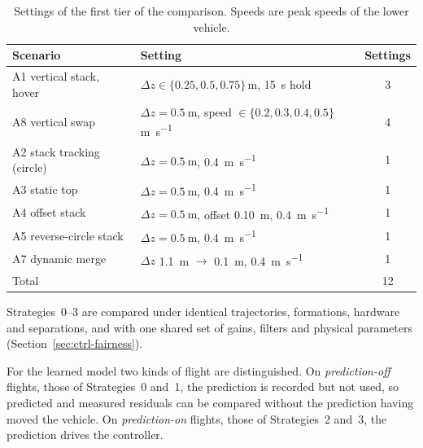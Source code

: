 \begin{table}[t]
  \centering
  \caption{Settings of the first tier of the comparison. Speeds are peak speeds of the lower vehicle.}
  \label{tab:setup-tier1}
  \small
  \begin{tabular}{@{}llc@{}}
    \toprule
    Scenario & Setting & Settings \\
    \midrule
    A1 vertical stack, hover & $\Delta z \in \{0.25, 0.5, 0.75\}$\,\si{\metre}, \SI{15}{\second} hold & 3 \\
    A8 vertical swap & $\Delta z = \SI{0.5}{\metre}$, speed $\in \{0.2, 0.3, 0.4, 0.5\}$\,\si{\metre\per\second} & 4 \\
    A2 stack tracking (circle) & $\Delta z = \SI{0.5}{\metre}$, \SI{0.4}{\metre\per\second} & 1 \\
    A3 static top & $\Delta z = \SI{0.5}{\metre}$, \SI{0.4}{\metre\per\second} & 1 \\
    A4 offset stack & $\Delta z = \SI{0.5}{\metre}$, offset \SI{0.10}{\metre}, \SI{0.4}{\metre\per\second} & 1 \\
    A5 reverse-circle stack & $\Delta z = \SI{0.5}{\metre}$, \SI{0.4}{\metre\per\second} & 1 \\
    A7 dynamic merge & $\Delta z$ \SI{1.1}{\metre} $\to$ \SI{0.1}{\metre}, \SI{0.4}{\metre\per\second} & 1 \\
    \midrule
    Total & & 12 \\
    \bottomrule
  \end{tabular}
\end{table}

Strategies~0--3 are compared under identical trajectories, formations, hardware and separations,
and with one shared set of gains, filters and physical parameters (Section~\ref{sec:ctrl-fairness}).

For the learned model two kinds of flight are distinguished. On \emph{prediction-off} flights,
those of Strategies~0 and~1, the prediction is recorded but not used, so predicted and measured
residuals can be compared without the prediction having moved the vehicle. On
\emph{prediction-on} flights, those of Strategies~2 and~3, the prediction drives the controller.

